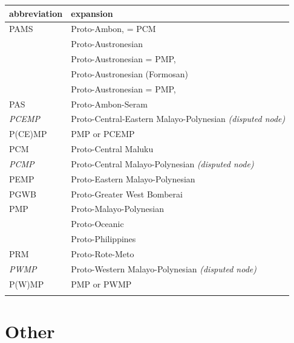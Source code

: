 {\wg
\begin{xltabular}{\textwidth}[l]{l>{\raggedright\arraybackslash}X}
\lsptoprule				
{abbreviation}	&	{expansion}	\\	\midrule \hhline{~}
\endhead
PAMS	&	Proto-Ambon, \citet{Stresemann1927} = PCM	\\	
	&	Proto-Austronesian	\\	
	&	Proto-Austronesian = PMP, \citet{Dempwolff1938} \\	
	&	Proto-Austronesian (Formosan)	\\	
	&	Proto-Austronesian = PMP, \citet{Stresemann1927}	\\	
PAS	&	Proto-Ambon-Seram	\\	
\it{PCEMP}	&	Proto-Central-Eastern Malayo-Polynesian \it{(disputed node)}	\\	
P(CE)MP	&	PMP or PCEMP	\\	
PCM	&	Proto-Central Maluku	\\	
\it{PCMP}	&	Proto-Central Malayo-Polynesian \it{(disputed node)}	\\	
PEMP	&	Proto-Eastern Malayo-Polynesian	\\	
PGWB	&	Proto-Greater West Bomberai \citep{UsherSchapper2022}	\\	
PMP	&	Proto-Malayo-Polynesian	\\	
	&	Proto-Oceanic	\\	
	&	Proto-Philippines	\\
PRM	&	Proto-Rote-Meto \citep{Edwards2021}	\\	
\it{PWMP}	&	Proto-Western Malayo-Polynesian \it{(disputed node)}	\\	
P(W)MP	&	PMP or PWMP	\\	\lspbottomrule
\end{xltabular}}

\section*{Other}

